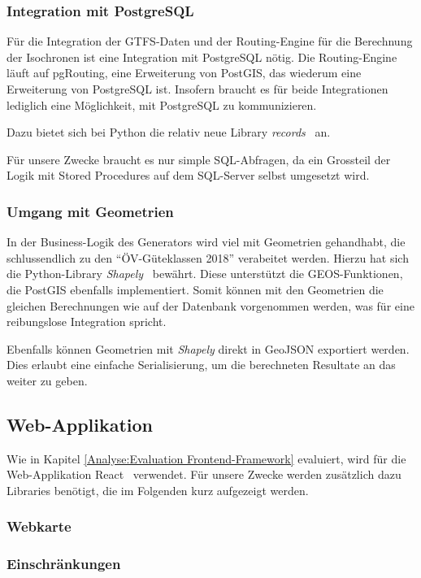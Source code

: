 \subsubsection{Integration mit PostgreSQL}
\label{analyse_generator:Integration mit PostgreSQL}

Für die Integration der GTFS-Daten und der Routing-Engine für die Berechnung der Isochronen ist eine Integration mit PostgreSQL nötig.
Die Routing-Engine läuft auf pgRouting, eine Erweiterung von PostGIS, das wiederum eine Erweiterung von PostgreSQL ist.
Insofern braucht es für beide Integrationen lediglich eine Möglichkeit, mit PostgreSQL zu kommunizieren.

Dazu bietet sich bei Python die relativ neue Library \emph{records}~\cite{records} an.

Für unsere Zwecke braucht es nur simple SQL-Abfragen, da ein Grossteil der Logik mit \glspl{Stored Procedure} auf dem SQL-Server selbst umgesetzt wird.

\subsubsection{Umgang mit Geometrien}
\label{analyse_generator: Umgang mit Geometrien}

In der Business-Logik des Generators wird viel mit Geometrien gehandhabt, die schlussendlich zu den "`ÖV-Güteklassen 2018"' verabeitet werden.
Hierzu hat sich die Python-Library \emph{Shapely}~\cite{shapely} bewährt.
Diese unterstützt die \gls{GEOS}-Funktionen, die PostGIS ebenfalls implementiert.
Somit können mit den Geometrien die gleichen Berechnungen wie auf der Datenbank vorgenommen werden, was für eine reibungslose Integration spricht.

Ebenfalls können Geometrien mit \emph{Shapely} direkt in \gls{GeoJSON} exportiert werden.
Dies erlaubt eine einfache Serialisierung, um die berechneten Resultate an das  weiter zu geben.

\subsection{Web-Applikation}
\label{analyse:Web-Applikation}

Wie in Kapitel \ref{Analyse:Evaluation Frontend-Framework} evaluiert, wird für die Web-Applikation React~\cite{react} verwendet.
Für unsere Zwecke werden zusätzlich dazu Libraries benötigt, die im Folgenden kurz aufgezeigt werden.

\subsubsection{Webkarte}
\label{analyse_webapp:Webkarte}




\subsubsection{Einschränkungen}
\label{Analyse:Einschränkungen}

